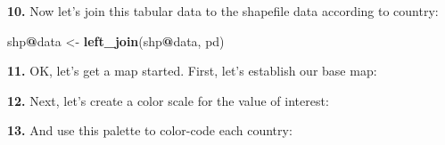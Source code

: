 \documentclass[]{book}
\newenvironment{Shaded}{\begin{snugshade}}{\end{snugshade}}
\newcommand{\DataTypeTok}[1]{\textcolor[rgb]{0.13,0.29,0.53}{#1}}
\newcommand{\DecValTok}[1]{\textcolor[rgb]{0.00,0.00,0.81}{#1}}
\newcommand{\FloatTok}[1]{\textcolor[rgb]{0.00,0.00,0.81}{#1}}
\newcommand{\KeywordTok}[1]{\textcolor[rgb]{0.13,0.29,0.53}{\textbf{#1}}}
\newcommand{\NormalTok}[1]{#1}
\newcommand{\OperatorTok}[1]{\textcolor[rgb]{0.81,0.36,0.00}{\textbf{#1}}}
\newcommand{\OtherTok}[1]{\textcolor[rgb]{0.56,0.35,0.01}{#1}}
\newcommand{\StringTok}[1]{\textcolor[rgb]{0.31,0.60,0.02}{#1}}
\begin{document}
\textbf{10.} Now let's join this tabular data to the shapefile data according to country:

\begin{Shaded}
\begin{Highlighting}[]
\NormalTok{shp}\OperatorTok{@}\NormalTok{data <-}\StringTok{ }\KeywordTok{left_join}\NormalTok{(shp}\OperatorTok{@}\NormalTok{data, pd)}
\end{Highlighting}
\end{Shaded}

\textbf{11.} OK, let's get a map started. First, let's establish our base map:

\begin{Shaded}
\end{Shaded}

\textbf{12.} Next, let's create a color scale for the value of interest:

\begin{Shaded}
\end{Shaded}

\textbf{13.} And use this palette to color-code each country:

\begin{Shaded}
\end{Shaded}
\end{document}
